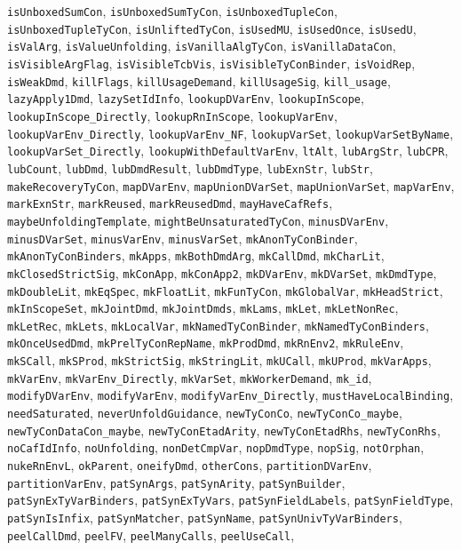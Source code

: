 \texttt{isUnboxedSumCon}, \texttt{isUnboxedSumTyCon}, \texttt{isUnboxedTupleCon}, \texttt{isUnboxedTupleTyCon}, \texttt{isUnliftedTyCon}, \texttt{isUsedMU}, \texttt{isUsedOnce}, \texttt{isUsedU}, \texttt{isValArg}, \texttt{isValueUnfolding}, \texttt{isVanillaAlgTyCon}, \texttt{isVanillaDataCon}, \texttt{isVisibleArgFlag}, \texttt{isVisibleTcbVis}, \texttt{isVisibleTyConBinder}, \texttt{isVoidRep}, \texttt{isWeakDmd}, \texttt{killFlags}, \texttt{killUsageDemand}, \texttt{killUsageSig}, \texttt{kill_usage}, \texttt{lazyApply1Dmd}, \texttt{lazySetIdInfo}, \texttt{lookupDVarEnv}, \texttt{lookupInScope}, \texttt{lookupInScope_Directly}, \texttt{lookupRnInScope}, \texttt{lookupVarEnv}, \texttt{lookupVarEnv_Directly}, \texttt{lookupVarEnv_NF}, \texttt{lookupVarSet}, \texttt{lookupVarSetByName}, \texttt{lookupVarSet_Directly}, \texttt{lookupWithDefaultVarEnv}, \texttt{ltAlt}, \texttt{lubArgStr}, \texttt{lubCPR}, \texttt{lubCount}, \texttt{lubDmd}, \texttt{lubDmdResult}, \texttt{lubDmdType}, \texttt{lubExnStr}, \texttt{lubStr}, \texttt{makeRecoveryTyCon}, \texttt{mapDVarEnv}, \texttt{mapUnionDVarSet}, \texttt{mapUnionVarSet}, \texttt{mapVarEnv}, \texttt{markExnStr}, \texttt{markReused}, \texttt{markReusedDmd}, \texttt{mayHaveCafRefs}, \texttt{maybeUnfoldingTemplate}, \texttt{mightBeUnsaturatedTyCon}, \texttt{minusDVarEnv}, \texttt{minusDVarSet}, \texttt{minusVarEnv}, \texttt{minusVarSet}, \texttt{mkAnonTyConBinder}, \texttt{mkAnonTyConBinders}, \texttt{mkApps}, \texttt{mkBothDmdArg}, \texttt{mkCallDmd}, \texttt{mkCharLit}, \texttt{mkClosedStrictSig}, \texttt{mkConApp}, \texttt{mkConApp2}, \texttt{mkDVarEnv}, \texttt{mkDVarSet}, \texttt{mkDmdType}, \texttt{mkDoubleLit}, \texttt{mkEqSpec}, \texttt{mkFloatLit}, \texttt{mkFunTyCon}, \texttt{mkGlobalVar}, \texttt{mkHeadStrict}, \texttt{mkInScopeSet}, \texttt{mkJointDmd}, \texttt{mkJointDmds}, \texttt{mkLams}, \texttt{mkLet}, \texttt{mkLetNonRec}, \texttt{mkLetRec}, \texttt{mkLets}, \texttt{mkLocalVar}, \texttt{mkNamedTyConBinder}, \texttt{mkNamedTyConBinders}, \texttt{mkOnceUsedDmd}, \texttt{mkPrelTyConRepName}, \texttt{mkProdDmd}, \texttt{mkRnEnv2}, \texttt{mkRuleEnv}, \texttt{mkSCall}, \texttt{mkSProd}, \texttt{mkStrictSig}, \texttt{mkStringLit}, \texttt{mkUCall}, \texttt{mkUProd}, \texttt{mkVarApps}, \texttt{mkVarEnv}, \texttt{mkVarEnv_Directly}, \texttt{mkVarSet}, \texttt{mkWorkerDemand}, \texttt{mk_id}, \texttt{modifyDVarEnv}, \texttt{modifyVarEnv}, \texttt{modifyVarEnv_Directly}, \texttt{mustHaveLocalBinding}, \texttt{needSaturated}, \texttt{neverUnfoldGuidance}, \texttt{newTyConCo}, \texttt{newTyConCo_maybe}, \texttt{newTyConDataCon_maybe}, \texttt{newTyConEtadArity}, \texttt{newTyConEtadRhs}, \texttt{newTyConRhs}, \texttt{noCafIdInfo}, \texttt{noUnfolding}, \texttt{nonDetCmpVar}, \texttt{nopDmdType}, \texttt{nopSig}, \texttt{notOrphan}, \texttt{nukeRnEnvL}, \texttt{okParent}, \texttt{oneifyDmd}, \texttt{otherCons}, \texttt{partitionDVarEnv}, \texttt{partitionVarEnv}, \texttt{patSynArgs}, \texttt{patSynArity}, \texttt{patSynBuilder}, \texttt{patSynExTyVarBinders}, \texttt{patSynExTyVars}, \texttt{patSynFieldLabels}, \texttt{patSynFieldType}, \texttt{patSynIsInfix}, \texttt{patSynMatcher}, \texttt{patSynName}, \texttt{patSynUnivTyVarBinders}, \texttt{peelCallDmd}, \texttt{peelFV}, \texttt{peelManyCalls}, \texttt{peelUseCall}, 